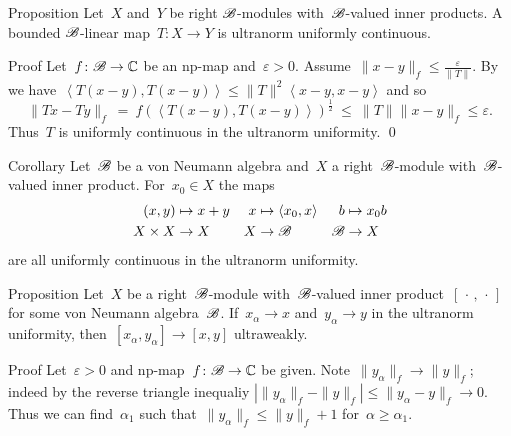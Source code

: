 \documentclass[b]{subfiles}
\begin{document}
\begin{parsec}%
\begin{point}{Proposition}%
Let~$X$ and~$Y$ be right $\mathscr{B}$-modules
    with~$\mathscr{B}$-valued inner products.
A bounded $\mathscr{B}$-linear map~$T\colon X \to Y$
    is ultranorm uniformly continuous.
\begin{point}{Proof}%
Let~$f\colon \mathscr{B} \to \mathbb{C}$ be an np-map
    and~$\varepsilon > 0$.
Assume~$\|x-y\|_f \leq \frac{\varepsilon}{\|T\|}$.
By 
we have~$\left<T(x-y), T(x-y)\right> \leq \|T\|^2\left<x-y,x-y\right>$
and so
\begin{equation*}
    \|Tx - Ty\|_f \  =\  f(\left<T(x-y),T(x-y)\right>)^{\frac{1}{2}}
\ \leq\  \|T\| \|x-y\|_f \leq \varepsilon.
\end{equation*}
Thus~$T$ is uniformly continuous in the ultranorm uniformity. \qed
\end{point}
\end{point}
\begin{point}[ultranormcontstruct]{Corollary}%
Let~$\mathscr{B}$ be a von Neumann algebra
    and~$X$ a right~$\mathscr{B}$-module
    with~$\mathscr{B}$-valued inner product.
For~$x_0 \in X$ the maps
\begin{align*}
    (x,y) &\mapsto x+y & x &\mapsto \left<x_0, x\right>
    & b &\mapsto x_0 b \\
    X\times X &\to X & X &\to \mathscr{B} & \mathscr{B} & \to X
\end{align*}
are all uniformly continuous in the ultranorm uniformity.
\end{point}
\begin{point}{Proposition}%
Let~$X$ be a right~$\mathscr{B}$-module
    with~$\mathscr{B}$-valued inner product~$[\,\cdot\,,\,\cdot\,]$
    for some von Neumann algebra~$\mathscr{B}$.
If~$x_\alpha \to x$ and~$y_\alpha \to y$
    in the ultranorm uniformity,
    then~$[x_\alpha,y_\alpha] \to [x,y]$ ultraweakly.
\begin{point}{Proof}%
Let~$\varepsilon > 0$ and np-map~$f\colon \mathscr{B} \to \mathbb{C}$ be given.
Note~$\|y_\alpha\|_f \to \|y\|_f$;
    indeed by the reverse triangle inequaliy 
    $|\|y_\alpha\|_f - \|y\|_f| \leq \| y_\alpha - y\|_f \to 0$.
Thus we can find~$\alpha_1$ such that~$\|y_\alpha\|_f \leq \|y\|_f + 1$
    for~$\alpha \geq \alpha_1$.


\end{point}
\end{point}
\end{parsec}
\end{document}
